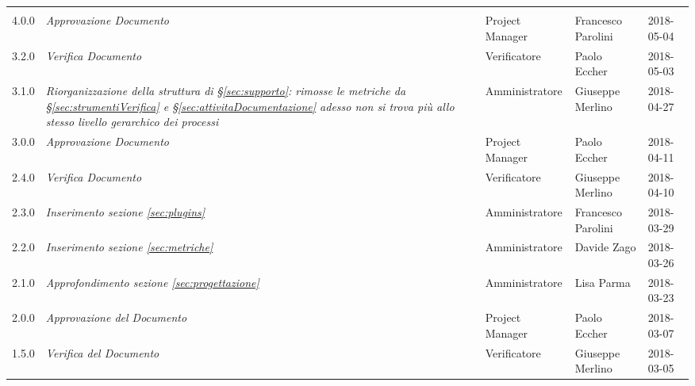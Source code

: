 
\section*{}

\begin{longtable}[H]{C{2cm}|C{4cm}|C{3cm}|C{3cm}|R{2cm}}

		
		
			 &  & &  & \\
		
		
		4.0.0  & \emph{Approvazione Documento} & Project Manager & Francesco Parolini &  2018-05-04 \\
		\hline

		3.2.0  & \emph{Verifica Documento} & Verificatore & Paolo Eccher &  2018-05-03 \\
		\hline

		3.1.0  & \emph{Riorganizzazione della struttura di §\ref{sec:supporto}: rimosse le metriche da §\ref{sec:strumentiVerifica} e §\ref{sec:attivitaDocumentazione} adesso non si trova più allo stesso livello gerarchico dei processi  } & Amministratore & Giuseppe Merlino &  2018-04-27 \\
		\hline
				
		3.0.0  & \emph{Approvazione Documento} & Project Manager & Paolo Eccher &  2018-04-11 \\
		\hline
		
			2.4.0  & \emph{Verifica Documento} & Verificatore & Giuseppe Merlino &  2018-04-10 \\
		\hline
		
		2.3.0  & \emph{Inserimento sezione \ref{sec:plugins}} & Amministratore & Francesco Parolini &  2018-03-29 \\
		\hline

		2.2.0  & \emph{Inserimento sezione \ref{sec:metriche}} & Amministratore & Davide Zago &  2018-03-26 \\
		\hline
		
		2.1.0  & \emph{Approfondimento sezione \ref{sec:progettazione}} & Amministratore & Lisa Parma &  2018-03-23 \\
		\hline
		
		2.0.0  & \emph{Approvazione del Documento} & Project Manager & Paolo Eccher&  2018-03-07 \\
		\hline
		
		1.5.0  &  \emph{Verifica del Documento} & Verificatore & Giuseppe Merlino & 2018-03-05 \\
		\hline
		

\end{longtable}
